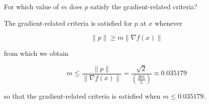 For which value of $m$ does $p$ satisfy the gradient-related criteria?

\begin{solution}
    The gradient-related criteria is satisfied for $p$ at $x$ whenever

    $$
    \lVert p \rVert \ge m \lVert \nabla f(x) \rVert
    $$

    from which we obtain

    $$
    m \le \frac{\lVert p \rVert}{\lVert \nabla f(x) \rVert} = \frac{\sqrt{2}}{\left(\frac{201}{5}\right)} \approx 0.035179
    $$

    so that the gradient-related criteria is satisfied when $m \le 0.035179$.
    \ \\
\end{solution}